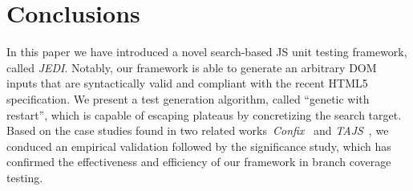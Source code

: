 \section{Conclusions}
\label{sec:concl}

In this paper we have introduced a novel search-based JS unit testing framework, called \emph{JEDI}. Notably, our framework is able to generate an arbitrary DOM inputs that are syntactically valid and compliant with the recent HTML5 specification. We present a test generation algorithm, called ``genetic with restart'', which is capable of escaping plateaus by concretizing the search target. Based on the case studies found in two related works~\emph{Confix}~\cite{amin:ase15} and \emph{TAJS}~\cite{dom2011}, we conduced an empirical validation followed by the significance study, which has confirmed the effectiveness and efficiency of our framework in branch coverage testing.
